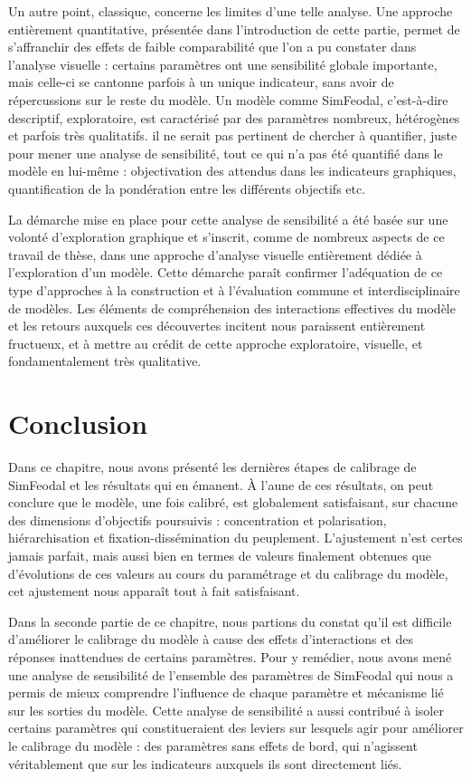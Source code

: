 Un autre point, classique, concerne les limites d'une telle analyse.
Une approche entièrement quantitative, présentée dans l'introduction de cette partie, permet de s'affranchir des effets de faible comparabilité que l'on a pu constater dans l'analyse visuelle : certains paramètres ont une sensibilité globale importante, mais celle-ci se cantonne parfois à un unique indicateur, sans avoir de répercussions sur le reste du modèle.
Un modèle comme SimFeodal, c'est-à-dire descriptif, exploratoire, est caractérisé par des paramètres nombreux, hétérogènes et parfois très qualitatifs.
il ne serait pas pertinent de chercher à quantifier, juste pour mener une analyse de sensibilité, tout ce qui n'a pas été quantifié dans le modèle en lui-même : objectivation des attendus dans les indicateurs graphiques, quantification de la pondération entre les différents objectifs etc.

La démarche mise en place pour cette analyse de sensibilité a été basée sur une volonté d'exploration graphique et s'inscrit, comme de nombreux aspects de ce travail de thèse, dans une approche d'analyse visuelle entièrement dédiée à l'exploration d'un modèle.
Cette démarche paraît confirmer l'adéquation de ce type d'approches à la construction et à l'évaluation commune et interdisciplinaire de modèles.
Les éléments de compréhension des interactions effectives du modèle et les retours auxquels ces découvertes incitent nous paraissent entièrement fructueux, et à mettre au crédit de cette approche exploratoire, visuelle, et fondamentalement très qualitative.

\section*{Conclusion}

Dans ce chapitre, nous avons présenté les dernières étapes de calibrage de SimFeodal et les résultats qui en émanent.
À l'aune de ces résultats, on peut conclure que le modèle, une fois calibré, est globalement satisfaisant, sur chacune des dimensions d'objectifs poursuivis : concentration et polarisation, hiérarchisation et fixation-dissémination du peuplement.
L'ajustement n'est certes jamais parfait, mais aussi bien en termes de valeurs finalement obtenues que d'évolutions de ces valeurs au cours du paramétrage et du calibrage du modèle, cet ajustement nous apparaît tout à fait satisfaisant.

Dans la seconde partie de ce chapitre, nous partions du constat qu'il est difficile d'améliorer le calibrage du modèle à cause des effets d'interactions et des réponses inattendues de certains paramètres.
Pour y remédier, nous avons mené une analyse de sensibilité de l'ensemble des paramètres de SimFeodal qui nous a permis de mieux comprendre l'influence de chaque paramètre et mécanisme lié sur les sorties du modèle.
Cette analyse de sensibilité a aussi contribué à isoler certains paramètres qui constitueraient des leviers sur lesquels agir pour améliorer le calibrage du modèle : des paramètres sans effets de bord, qui n'agissent véritablement que sur les indicateurs auxquels ils sont directement liés.


